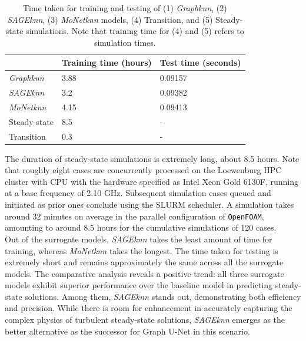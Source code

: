 \begin{table}[ht]
    \centering
    \caption{Time taken for training and testing of  (1) \textit{Graphknn}, (2) \textit{SAGEknn}, (3) \textit{MoNetknn} models, (4) Transition, and (5) Steady-state simulations. Note that training time for (4) and (5) refers to simulation times.} 
    \label{t:times}
    \begin{tabular}{|l|l|l|}
    \hline
    & \textbf{Training time (hours)} & \textbf{Test time (seconds)} \\
    \hline
    \textit{Graphknn} & 3.88 & 0.09157 \\
    \hline
    \textit{SAGEknn} & 3.2 & 0.09382 \\
    \hline
    \textit{MoNetknn} & 4.15 & 0.09413 \\
    \hline
    Steady-state& 8.5 & - \\
    \hline
    Transition & 0.3 & - \\
    \hline
    \end{tabular}
\end{table}
The duration of steady-state simulations is extremely long, about 8.5 hours. Note that roughly eight cases are concurrently processed on the Loewenburg HPC cluster with \gls{CPU} with the hardware specified as Intel Xeon Gold 6130F, running at a base frequency of 2.10 GHz. Subsequent simulation cases queued and initiated as prior ones conclude using the \gls{SLURM} scheduler. A simulation takes around 32 minutes on average in the parallel configuration of \verb |OpenFOAM|, amounting to around 8.5 hours for the cumulative simulations of 120 cases. \\
Out of the surrogate models, \textit{SAGEknn} takes the least amount of time for training, whereas \textit{MoNetknn} takes the longest. The time taken for testing is extremely short and remains approximately the same across all the surrogate models. The comparative analysis reveals a positive trend: all three surrogate models exhibit superior performance over the baseline model in predicting steady-state solutions. Among them, \textit{SAGEknn} stands out, demonstrating both efficiency and precision. While there is room for enhancement in accurately capturing the complex physics of turbulent steady-state solutions, \textit{SAGEknn} emerges as the better alternative as the successor for Graph U-Net in this scenario. \\
